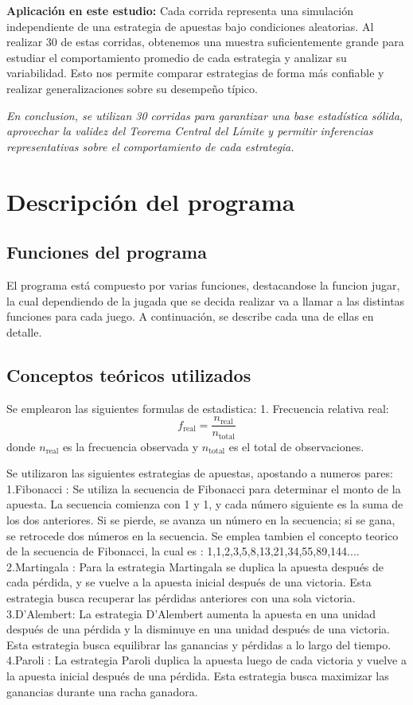\documentclass{article}
\begin{document}
\noindent
\textbf{Aplicación en este estudio:} Cada corrida representa una simulación independiente de una estrategia de apuestas bajo condiciones aleatorias. Al realizar 30 de estas corridas, obtenemos una muestra suficientemente grande para estudiar el comportamiento promedio de cada estrategia y analizar su variabilidad. Esto nos permite comparar estrategias de forma más confiable y realizar generalizaciones sobre su desempeño típico.

\begin{center}
    \textit{En conclusion, se utilizan 30 corridas para garantizar una base estadística sólida, aprovechar la validez del Teorema Central del Límite y permitir inferencias representativas sobre el comportamiento de cada estrategia.}
\end{center}
    
\section{Descripción del programa}
\subsection{Funciones del programa}
El programa está compuesto por varias funciones, destacandose la funcion jugar, la cual dependiendo de la jugada que se decida realizar va a llamar a las distintas funciones para cada juego. A continuación, se describe cada una de ellas en detalle.

\subsection{Conceptos teóricos utilizados}
Se emplearon las siguientes formulas de estadistica:
1. Frecuencia relativa real:
\[
f_{\text{real}} = \frac{n_{\text{real}}}{n_{\text{total}}}
\]
donde \( n_{\text{real}} \) es la frecuencia observada y \( n_{\text{total}} \) es el total de observaciones.

Se utilizaron las siguientes estrategias de apuestas, apostando a numeros pares:
1.Fibonacci : 
Se utiliza la secuencia de Fibonacci para determinar el monto de la apuesta. La secuencia comienza con 1 y 1, y cada número siguiente es la suma de los dos anteriores. Si se pierde, se avanza un número en la secuencia; si se gana, se retrocede dos números en la secuencia.
Se emplea tambien el concepto teorico de la secuencia de Fibonacci, la cual es : 1,1,2,3,5,8,13,21,34,55,89,144....
2.Martingala :
Para la estrategia Martingala se duplica la apuesta después de cada pérdida, y se vuelve a la apuesta inicial después de una victoria. Esta estrategia busca recuperar las pérdidas anteriores con una sola victoria.
3.D’Alembert:
La estrategia D'Alembert aumenta la apuesta en una unidad después de una pérdida y la disminuye en una unidad después de una victoria. Esta estrategia busca equilibrar las ganancias y pérdidas a lo largo del tiempo.
4.Paroli : 
La estrategia Paroli duplica la apuesta luego de cada victoria y vuelve a la apuesta inicial después de una pérdida. Esta estrategia busca maximizar las ganancias durante una racha ganadora.
\end{document}
